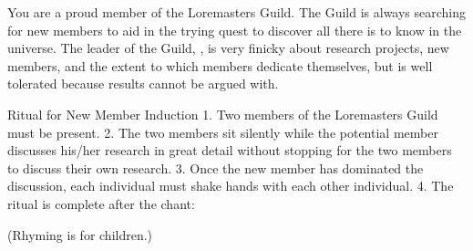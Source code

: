 \documentclass[green]{guildcamp2}
\begin{document}
\name{\gnewmemberlore{}}

You are a proud member of the Loremasters Guild. The Guild is always searching for new members to aid in the trying quest to discover all there is to know in the universe. The leader of the Guild, \cVampire{}, is very finicky about research projects, new members, and the extent to which members dedicate themselves, but \cVampire{\they} is well tolerated because \cVampire{\their} results cannot be argued with. 

Ritual for New Member Induction
1.	Two members of the Loremasters Guild must be present.
2.	The two members sit silently while the potential member discusses his/her research in great detail without stopping for the two members to discuss their own research.
3.	Once the new member has dominated the discussion, each individual must shake hands with each other individual.
4.	The ritual is complete after the chant:


(Rhyming is for children.)
\end{document}
